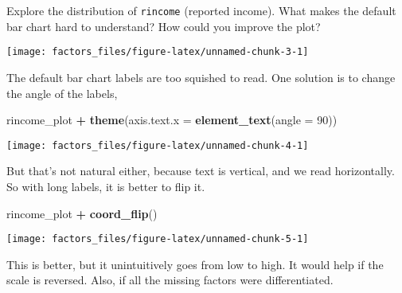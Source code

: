 \documentclass[]{book}
\newenvironment{Shaded}{\begin{snugshade}}{\end{snugshade}}
\newcommand{\DataTypeTok}[1]{\textcolor[rgb]{0.13,0.29,0.53}{#1}}
\newcommand{\DecValTok}[1]{\textcolor[rgb]{0.00,0.00,0.81}{#1}}
\newcommand{\KeywordTok}[1]{\textcolor[rgb]{0.13,0.29,0.53}{\textbf{#1}}}
\newcommand{\NormalTok}[1]{#1}
\newcommand{\OperatorTok}[1]{\textcolor[rgb]{0.81,0.36,0.00}{\textbf{#1}}}
\newcommand{\StringTok}[1]{\textcolor[rgb]{0.31,0.60,0.02}{#1}}
\theoremstyle{plain}
\theoremstyle{remark}
\theoremstyle{definition}
\theoremstyle{definition}
\theoremstyle{definition}
\theoremstyle{remark}
\begin{document}
Explore the distribution of \texttt{rincome} (reported income). What
makes the default bar chart hard to understand? How could you improve
the plot?

\begin{Shaded}
\end{Shaded}

\begin{center}\texttt{[image: factors\_files/figure-latex/unnamed-chunk-3-1]} \end{center}

The default bar chart labels are too squished to read. One solution is
to change the angle of the labels,

\begin{Shaded}
\begin{Highlighting}[]
\NormalTok{rincome_plot }\OperatorTok{+}
\StringTok{  }\KeywordTok{theme}\NormalTok{(}\DataTypeTok{axis.text.x =} \KeywordTok{element_text}\NormalTok{(}\DataTypeTok{angle =} \DecValTok{90}\NormalTok{))}
\end{Highlighting}
\end{Shaded}

\begin{center}\texttt{[image: factors\_files/figure-latex/unnamed-chunk-4-1]} \end{center}

But that's not natural either, because text is vertical, and we read
horizontally. So with long labels, it is better to flip it.

\begin{Shaded}
\begin{Highlighting}[]
\NormalTok{rincome_plot }\OperatorTok{+}
\StringTok{  }\KeywordTok{coord_flip}\NormalTok{()}
\end{Highlighting}
\end{Shaded}

\begin{center}\texttt{[image: factors\_files/figure-latex/unnamed-chunk-5-1]} \end{center}

This is better, but it unintuitively goes from low to high. It would
help if the scale is reversed. Also, if all the missing factors were
differentiated.
\end{document}
